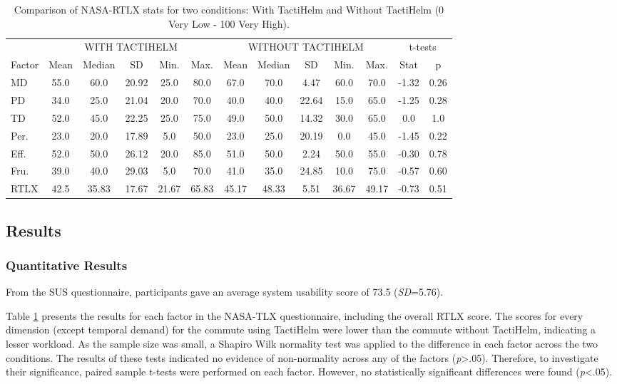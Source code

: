 \documentclass{mpaper}
\begin{document}
\begin{table}[h]
    \centering
    \begin{tabular}{l|ccccc|ccccc|cc}
    \multicolumn{1}{c}{} & \multicolumn{5}{c|}{WITH TACTIHELM} & \multicolumn{5}{c|}{WITHOUT TACTIHELM} & \multicolumn{2}{c}{t-tests} \\ \cline{2-13}
    Factor & Mean & Median & SD & Min. & Max. & Mean & Median & SD & Min. & Max. & Stat & p \\ \hline
    MD & 55.0 & 60.0 & 20.92 & 25.0 & 80.0 & 67.0 & 70.0 & 4.47 & 60.0 & 70.0 & -1.32 & 0.26 \\
    PD & 34.0 & 25.0 & 21.04 & 20.0 & 70.0 & 40.0 & 40.0 & 22.64 & 15.0 & 65.0  & -1.25 & 0.28 \\
    TD & 52.0 & 45.0 & 22.25 & 25.0 & 75.0 & 49.0 & 50.0 & 14.32 & 30.0 & 65.0 & 0.0 & 1.0 \\
    Per. & 23.0 & 20.0 & 17.89 & 5.0 & 50.0 & 23.0 & 25.0 & 20.19 & 0.0 & 45.0 & -1.45 & 0.22 \\
    Eff. & 52.0 & 50.0 & 26.12 & 20.0 & 85.0 & 51.0 & 50.0 & 2.24 & 50.0 & 55.0  & -0.30 & 0.78 \\
    Fru. & 39.0 & 40.0 & 29.03 & 5.0 & 70.0 & 41.0 & 35.0 & 24.85 & 10.0 & 75.0 & -0.57 & 0.60 \\
    RTLX & 42.5 & 35.83 & 17.67 & 21.67 & 65.83 & 45.17 & 48.33 & 5.51 & 36.67 & 49.17 & -0.73 & 0.51 \\
    \end{tabular}
    \caption{Comparison of NASA-RTLX stats for two conditions: With TactiHelm and Without TactiHelm (0 Very Low - 100 Very High).}
    \label{tab:nasa-rtlx-stats}
\end{table}

\subsection{Results}
\subsubsection{Quantitative Results}
From the SUS questionnaire, participants gave an average system usability score of 73.5 (\textit{SD}=5.76).

Table \ref{tab:nasa-rtlx-stats} presents the results for each factor in the NASA-TLX questionnaire, including the overall RTLX score. The scores for every dimension (except temporal demand) for the commute using TactiHelm were lower than the commute without TactiHelm, indicating a lesser workload. As the sample size was small, a Shapiro Wilk normality test was applied to the difference in each factor across the two conditions. The results of these tests indicated no evidence of non-normality across any of the factors (\textit{p}>.05). Therefore, to investigate their significance, paired sample t-tests were performed on each factor. However, no statistically significant differences were found (\textit{p}<.05).
\end{document}
